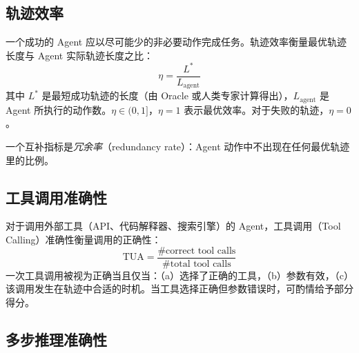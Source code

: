 \subsection{轨迹效率}
\label{trajectory-efficiency}

一个成功的 Agent 应以尽可能少的非必要动作完成任务。轨迹效率衡量最优轨迹长度与 Agent 实际轨迹长度之比：
\begin{equation}
    \eta = \frac{L^*}{L_{\text{agent}}}
\end{equation}
其中 $L^*$ 是最短成功轨迹的长度（由 Oracle 或人类专家计算得出），$L_{\text{agent}}$ 是 Agent 所执行的动作数。$\eta \in (0, 1]$，$\eta = 1$ 表示最优效率。对于失败的轨迹，$\eta = 0$。

一个互补指标是\emph{冗余率}（redundancy rate）：Agent 动作中不出现在任何最优轨迹里的比例。

\subsection{工具调用准确性}
\label{tool-use-accuracy}

对于调用外部工具（API、代码解释器、搜索引擎）的 Agent，工具调用（Tool Calling）准确性衡量调用的正确性：
\begin{equation}
    \text{TUA} = \frac{\text{\# correct tool calls}}{\text{\# total tool calls}}
\end{equation}
一次工具调用被视为正确当且仅当：（a）选择了正确的工具，（b）参数有效，（c）该调用发生在轨迹中合适的时机。当工具选择正确但参数错误时，可酌情给予部分得分。

\subsection{多步推理准确性}
\label{multi-step-reasoning-accuracy}


